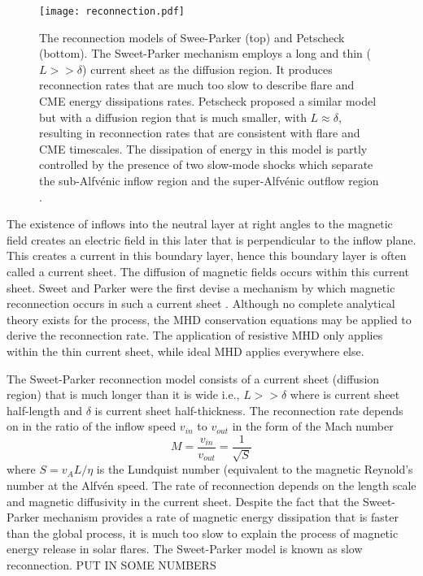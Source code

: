 \begin{figure}[!t]
\begin{center}
\texttt{[image: reconnection.pdf]}
\caption[Sweet-Parker and Petscheck reconnection models]{The reconnection models of Swee-Parker (top) and Petscheck (bottom). The Sweet-Parker mechanism employs a long and thin ($L>>\delta$) current sheet as the diffusion region. It produces reconnection rates that are much too slow to describe flare and CME energy dissipations rates. Petscheck proposed a similar model but with a diffusion region that is much smaller, with $L\approx\delta$, resulting in reconnection rates that are consistent with flare and CME timescales. The dissipation of energy in this model is partly controlled by the presence of two slow-mode shocks which separate the sub-Alfv\'{e}nic inflow region and the super-Alfv\'{e}nic outflow region \citep{asch2004}.}
\label{fig:recconection}
\end{center}
\end{figure}
The existence of inflows into the neutral layer at right angles to the magnetic field creates an electric field in this later that is perpendicular to the inflow plane. This creates a current in this boundary layer, hence this boundary layer is often called a current sheet. The diffusion of magnetic fields occurs within this current sheet. Sweet and Parker were the first devise a mechanism by which magnetic reconnection occurs in such a current sheet \cite{sweet1958, parker1963}. Although no complete analytical theory exists for the process, the MHD conservation equations may be applied to derive the reconnection rate. The application of resistive MHD only applies within the thin current sheet, while ideal MHD applies everywhere else.

The Sweet-Parker reconnection model consists of a current sheet (diffusion region) that is much longer than it is wide i.e., $L>>\delta$ where is current sheet half-length and $\delta$ is current sheet half-thickness. The reconnection rate depends on in the ratio of the inflow speed $v_{in}$ to $v_{out}$ in the form of the Mach number
\begin{equation}
M = \frac{v_{in}}{v_{out}} = \frac{1}{\sqrt{S}}
\end{equation}
where $S=v_AL/\eta$ is the Lundquist number (equivalent to the magnetic Reynold's number at the Alfv\'{e}n speed. The rate of reconnection depends on the length scale and magnetic diffusivity in the current sheet. Despite the fact that the Sweet-Parker mechanism provides a rate of magnetic energy dissipation that is faster than the global process, it is much too slow to explain the process of magnetic energy release in solar flares. The Sweet-Parker model is known as slow reconnection. PUT IN SOME NUMBERS

